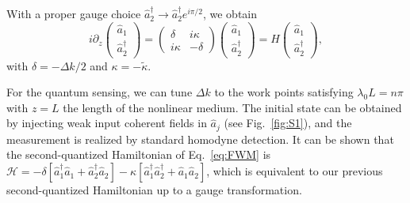 \documentclass[twocolumn,prl,floatfix,citeautoscript,nofootinbib,superscriptaddress]{revtex4}
\begin{document}
\begin{widetext}
With a proper gauge choice $\hat{a}_{2}^{\dag }\rightarrow \hat{a}_{2}^{\dag
}e^{i\pi /2}$, we obtain
\begin{equation}
i\partial _{z}\left(
\begin{array}{c}
\hat{a}_{1} \\
\hat{a}_{2}^{\dag }%
\end{array}%
\right) =\left(
\begin{array}{cc}
\delta & i{\kappa } \\
i{\kappa } & -\delta%
\end{array}%
\right) \left(
\begin{array}{c}
\hat{a}_{1} \\
\hat{a}_{2}^{\dag }%
\end{array}%
\right) =H\left(
\begin{array}{c}
\hat{a}_{1} \\
\hat{a}_{2}^{\dag }%
\end{array}%
\right) ,  \label{eq:FWM2}
\end{equation}%
with $\delta =-\Delta k/2$ and $\kappa =-\tilde{\kappa}$.

For the quantum sensing, we can tune $\Delta k$ to the work points
satisfying $\lambda _{0}L=n\pi $ with $z=L$ the length of the nonlinear
medium. The initial state can be obtained by injecting weak input coherent
fields in $\hat{a}_{j}$ (see Fig.~\ref{fig:S1}), and the measurement is
realized by standard homodyne detection. It can be shown that the
second-quantized Hamiltonian of Eq.~\ref{eq:FWM} is $\mathcal{H}=-\delta %
\left[ \hat{a}_{1}^{\dag }\hat{a}_{1}+\hat{a}_{2}^{\dag }\hat{a}_{2}\right]
-\kappa \left[ \hat{a}_{1}^{\dag }\hat{a}_{2}^{\dag }+\hat{a}_{1}\hat{a}_{2}%
\right] $, which is equivalent to our previous second-quantized Hamiltonian
up to a gauge transformation.


\end{widetext}
\end{document}
